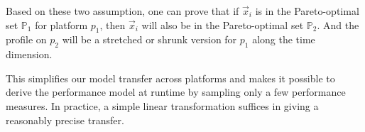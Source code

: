 Based on these two assumption, one can prove that if $\vec{x}_i$ is in the
Pareto-optimal set $\mathbb{P}_1$ for platform $p_1$, then $\vec{x}_i$ will also
be in the Pareto-optimal set $\mathbb{P}_2$. And the profile on $p_2$ will be a
stretched or shrunk version for $p_1$ along the time dimension.

This simplifies our model transfer across platforms and makes it possible to
derive the performance model at runtime by sampling only a few performance
measures. In practice, a simple linear transformation suffices in giving a
reasonably precise transfer.


